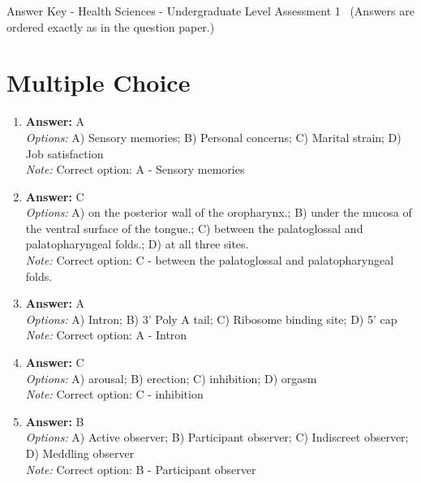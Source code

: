 \documentclass[12pt]{article}
\begin{document}
\begin{center}
Answer Key - Health Sciences - Undergraduate Level Assessment 1 \
\small (Answers are ordered exactly as in the question paper.)
\end{center}

\section*{Multiple Choice}
\begin{enumerate}[label=\arabic*.]
\item \textbf{Answer:} A
\\ \textit{Options:} A) Sensory memories; B) Personal concerns; C) Marital strain; D) Job satisfaction
\\ \textit{Note:} Correct option: A - Sensory memories
\item \textbf{Answer:} C
\\ \textit{Options:} A) on the posterior wall of the oropharynx.; B) under the mucosa of the ventral surface of the tongue.; C) between the palatoglossal and palatopharyngeal folds.; D) at all three sites.
\\ \textit{Note:} Correct option: C - between the palatoglossal and palatopharyngeal folds.
\item \textbf{Answer:} A
\\ \textit{Options:} A) Intron; B) 3' Poly A tail; C) Ribosome binding site; D) 5' cap
\\ \textit{Note:} Correct option: A - Intron
\item \textbf{Answer:} C
\\ \textit{Options:} A) arousal; B) erection; C) inhibition; D) orgasm
\\ \textit{Note:} Correct option: C - inhibition
\item \textbf{Answer:} B
\\ \textit{Options:} A) Active observer; B) Participant observer; C) Indiscreet observer; D) Meddling observer
\\ \textit{Note:} Correct option: B - Participant observer
\end{enumerate}
\end{document}

